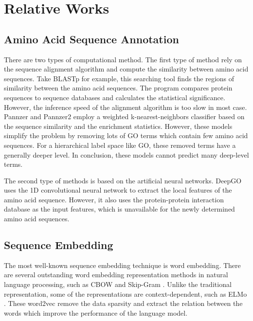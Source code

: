 \documentclass{article}
\begin{document}
\section{Relative Works}
    \subsection{Amino Acid Sequence Annotation}
        There are two types of computational method. The first type of method rely on the sequence alignment algorithm and compute the similarity between amino acid sequences. Take BLASTp \citep{BLAST} for example, this searching tool finds the regions of similarity between the amino acid  sequences. The program compares protein sequences to sequence databases and calculates the statistical significance. However, the inference speed of the alignment algorithm is too slow in most case. Pannzer \citep{doi:10.1093/bioinformatics/btu851} and Pannzer2 \citep{doi:10.1093/nar/gky350} employ a weighted k-nearest-neighbors classifier based on the sequence similarity and the enrichment statistics. However, these models simplify the problem by removing lots of GO terms which contain few amino acid sequences. For a hierarchical label space like GO, these removed terms have a generally deeper level. In conclusion, these models cannot predict many deep-level terms. \par
        The second type of methods is based on the artificial neural networks. DeepGO \citep{kulmanov2017deepgo} uses the 1D convolutional neural network to extract the local features of the amino acid sequence. However, it also uses the protein-protein interaction database as the input features, which is unavailable for the newly determined amino acid sequences.  \par

    \subsection{Sequence Embedding}
        The most well-known sequence embedding technique is word embedding. There are several outstanding word embedding representation methods in natural language processing, such as CBOW and Skip-Gram \citep{NIPS2013_5021}. Unlike the traditional representation, some of the representations are context-dependent, such as ELMo \citep{Peters:2018}. These word2vec remove the data sparsity and extract the relation between the words which improve the performance of the language model. \par
        
\end{document}
